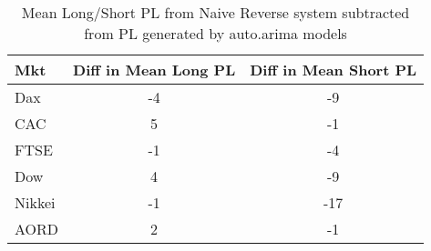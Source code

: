 \begin{table}[ht]
\centering
\caption[Mean PL from Auto.arima models inus mean PL from Naive Reverse system]{Mean Long/Short PL from Naive Reverse system subtracted from PL generated by auto.arima models} 
\label{tab:chp_ts:arima1_diff}
\begin{tabular}{lcc}
  \toprule Mkt & Diff in Mean Long PL & Diff in Mean Short PL \\ 
  \midrule Dax & -4 & -9 \\ 
  CAC & 5 & -1 \\ 
  FTSE & -1 & -4 \\ 
  Dow & 4 & -9 \\ 
  Nikkei & -1 & -17 \\ 
  AORD & 2 & -1 \\ 
   \bottomrule \end{tabular}
\end{table}
